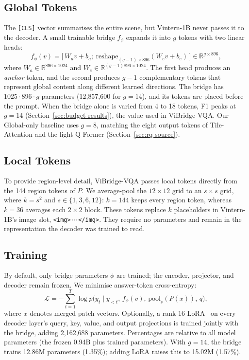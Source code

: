 \subsection{Global Tokens}
\label{sec:bridge}

The \texttt{[CLS]} vector summarises the entire scene, but Vintern-1B never passes it to the
decoder. A small trainable bridge $f_\phi$ expands it into $g$ tokens with two linear heads:
\begin{equation}
  f_\phi(v) = \big[\,W_a v + b_a;\ \mathrm{reshape}_{(g-1)\times 896}(W_e v + b_e)\,\big]
  \in \mathbb{R}^{g\times 896},
  \label{eq:bridge}
\end{equation}
where $W_a\in\mathbb{R}^{896\times1024}$ and $W_e\in\mathbb{R}^{(g-1)896\times1024}$. The first
head produces an \emph{anchor} token, and the second produces $g-1$ complementary tokens that
represent global content along different learned directions. The bridge has $1025\cdot896\cdot g$
parameters (12{,}857{,}600 for $g=14$), and its tokens are placed before the prompt. When the
bridge alone is varied from 4 to 18 tokens, F1 peaks at $g=14$
(Section~\ref{sec:budget-results}), the value used in ViBridge-VQA. Our Global-only baseline uses
$g=8$, matching the eight output tokens of Tile-Attention and the light Q-Former
(Section~\ref{sec:rq-source}).

\subsection{Local Tokens}
\label{sec:local}

To provide region-level detail, ViBridge-VQA passes local tokens directly from the 144 region
tokens of $P$. We average-pool the $12\times12$ grid to an $s\times s$ grid, where
$k=s^2$ and $s\in\{1,3,6,12\}$: $k=144$ keeps every region token, whereas $k=36$ averages each
$2\times2$ block. These tokens replace $k$ placeholders in Vintern-1B's image slot,
\texttt{<img>}\,$\cdots$\,\texttt{</img>}. They require no parameters and remain in the
representation the decoder was trained to read.

\subsection{Training}
\label{sec:training}

By default, only bridge parameters $\phi$ are trained; the encoder, projector, and decoder remain
frozen. We minimise answer-token cross-entropy:
\begin{equation}
  \mathcal{L} = -\sum_{t=1}^{T} \log p\big(y_t \mid y_{<t},\, f_\phi(v),\, \mathrm{pool}_s(P(x)),\, q\big),
  \label{eq:ce}
\end{equation}
where $x$ denotes merged patch vectors. Optionally, a rank-16
LoRA~\cite{hu2022lora} on every decoder layer's query, key, value, and output projections is
trained jointly with the bridge, adding 2{,}162{,}688 parameters. Percentages are relative to all
model parameters (the frozen 0.94B plus trained parameters). With $g=14$, the bridge trains
12.86M parameters (1.35\%); adding LoRA raises this to 15.02M (1.57\%).

